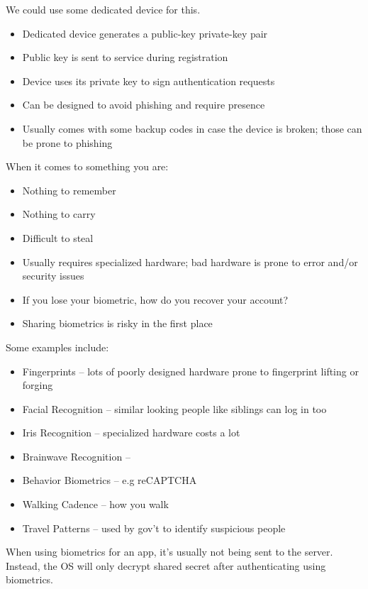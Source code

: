 \documentclass[12pt]{report}
\begin{document}
We could use some dedicated device for this.
\begin{itemize}[noitemsep]
    \item Dedicated device generates a public-key private-key pair
    \item Public key is sent to service during registration
    \item Device uses its private key to sign authentication requests
    \item Can be designed to avoid phishing and require presence
    \item Usually comes with some backup codes in case the device is broken; those can be prone to phishing
\end{itemize}

When it comes to something you are:
\begin{itemize}[noitemsep]
    \item Nothing to remember
    \item Nothing to carry
    \item Difficult to steal
    \item Usually requires specialized hardware; bad hardware is prone to error and/or security issues
    \item If you lose your biometric, how do you recover your account?
    \item Sharing biometrics is risky in the first place
\end{itemize}

Some examples include:
\begin{itemize}[noitemsep]
    \item Fingerprints -- lots of poorly designed hardware prone to fingerprint lifting or forging
    \item Facial Recognition -- similar looking people like siblings can log in too
    \item Iris Recognition -- specialized hardware costs a lot
    \item Brainwave Recognition --
    \item Behavior Biometrics -- e.g reCAPTCHA
    \item Walking Cadence -- how you walk
    \item Travel Patterns -- used by gov't to identify suspicious people
\end{itemize}

When using biometrics for an app, it's usually not being sent to the server. Instead, the OS will only decrypt shared secret after authenticating using biometrics.
\end{document}
